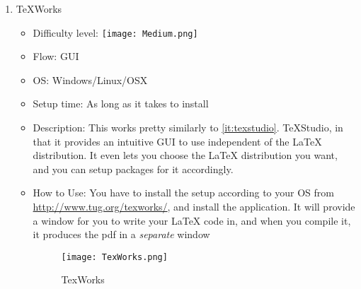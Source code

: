 \documentclass[12pt, letterpaper]{article}
\theoremstyle{remark}
\begin{document}
\begin{enumerate}
        \item TeXWorks \label{it:texworks}
        \begin{itemize}
            \item Difficulty level: \texttt{[image: Medium.png]}
            \item Flow: GUI
            \item OS: Windows/Linux/OSX
            \item Setup time: As long as it takes to install
            \item Description: This works pretty similarly to \ref{it:texstudio}. TeXStudio, in that it provides an intuitive GUI to use independent of the \LaTeX{} distribution. It even lets you choose the \LaTeX{} distribution you want, and you can setup packages for it accordingly.
            \item How to Use: You have to install the setup according to your OS from \url{http://www.tug.org/texworks/}, and install the application. It will provide a window for you to write your \LaTeX{} code in, and when you compile it, it produces the pdf in a \textit{separate} window
             \begin{figure}[h]
                \centering
                \texttt{[image: TexWorks.png]}
                \caption{TexWorks}
                \label{fig:TexWorks}
            \end{figure}
        \end{itemize}
        

\end{enumerate}
\end{document}
